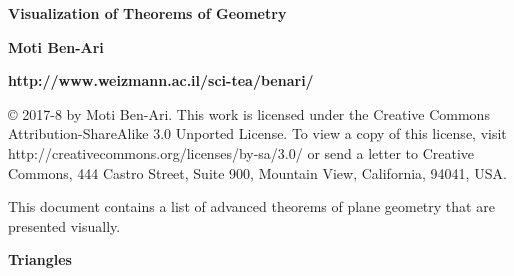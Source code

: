 \documentclass[a4paper]{article}
\begin{document}
\thispagestyle{empty}

\begin{center}
\textbf{\sffamily \Large Visualization of Theorems of Geometry}

\bigskip

\textbf{\sffamily \large Moti Ben-Ari}

\bigskip

\textbf{\sffamily \large http://www.weizmann.ac.il/sci-tea/benari/}

\end{center}

\textsf{\footnotesize \copyright{} 2017-8 by Moti Ben-Ari. This work is licensed under the Creative Commons Attribution-ShareAlike 3.0 Unported License. To view a copy of this license, visit http://creativecommons.org/licenses/by-sa/3.0/ or send a letter to Creative Commons, 444 Castro Street, Suite 900, Mountain View, California, 94041, USA.}

\bigskip


This document contains a list of advanced theorems of plane geometry that are presented visually.

\begin{center}
\Large\sffamily\bfseries Triangles
\end{center}
\end{document}
